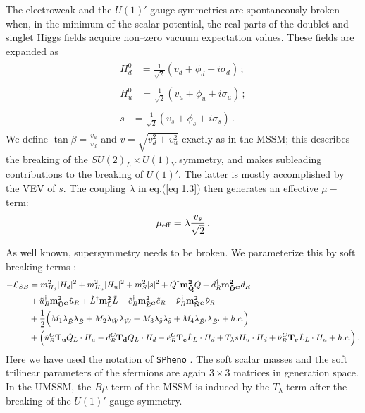 \documentclass[a4paper,11pt]{article}
\begin{document}
The electroweak and the $U(1)'$ gauge symmetries are spontaneously
broken when, in the minimum of the scalar potential, the real parts of
the doublet and singlet Higgs fields acquire non--zero vacuum
expectation values. These fields are expanded as
%
\begin{subequations} \label{vevs}
\begin{align}
\begin{split}
  H_d^0 &= \frac{1}{\sqrt{2}} \left( v_d + \phi_d + i\sigma_d \right)\,;
\end{split}\\
\begin{split}  
  H_u^0 &= \frac{1}{\sqrt{2}} \left( v_u + \phi_u + i\sigma_u \right)\,;  
\end{split}\\
\begin{split}  
  s &= \frac{1}{\sqrt{2}} \left( v_s + \phi_s + i\sigma_s \right)\,.            
\end{split}
\end{align}
\end{subequations}
%
We define $\tan{\beta} = \frac{v_u} {v_d}$ and
$v = \sqrt{v_d^2 + v_u^2}$ exactly as in the MSSM; this describes the
breaking of the $SU(2)_L \times U(1)_Y$ symmetry, and makes subleading
contributions to the breaking of $U(1)'$. The latter is mostly accomplished
by the VEV of $s$. The coupling $\lambda$ in
eq.(\ref{eq 1.3}) then generates an effective $\mu-$term:
%
\begin{equation} \label{eq 1.4}
\mu_{\rm eff} = \lambda \frac{v_{s}}{\sqrt{2}}\,. 
\end{equation}

As well known, supersymmetry needs to be broken. We parameterize this by
soft breaking terms \cite{book}:
%
\begin{align} \label{eq 1.66}
-\mathcal{L}_{SB} &= m^2_{H_d} |H_d|^2 + m^2_{H_u} |H_{u}|^2 + m_S^2 |s|^2
+ \tilde{Q}^\dagger {\bf m^2_{\tilde Q}} \tilde{Q} + 
\tilde{d}_R^{\dagger} {\bf m^2_{\tilde D^C}} \tilde{d}_R \nonumber \\
&+\tilde{u}_{R}^\dagger {\bf m^2_{\tilde U^C}} \tilde{u}_R
+\tilde{L}^\dagger {\bf m^2_{\tilde L}} \tilde{L} 
+\tilde{e}_R^\dagger {\bf m^2_{\tilde{E}^{C}}} \tilde{e}_R
+\tilde{\nu}_{R}^\dagger {\bf m^2_{\tilde N^C}} \tilde{\nu}_{R} \nonumber \\
&+\frac{1}{2}\Big( M_1 \lambda_{\tilde B} \lambda_{\tilde B} + 
M_2 \lambda_{\tilde W} \lambda_{\tilde W} + M_3 \lambda_{\tilde g} \lambda_{\tilde g}
+ M_4\lambda_{\tilde B'} \lambda_{\tilde B'} + h.c.\Big) \\
&+ \Big( \tilde{u}_R^C {\bf T_u} \tilde{Q}_L \cdot H_u 
- \tilde{d}_R^C {\bf T_d} \tilde{Q}_L \cdot H_d
- \tilde{e}_R^C{\bf T_e} \tilde{L}_L \cdot H_d + T_\lambda s H_u \cdot H_d
+ \tilde{\nu}_R^C {\bf T_\nu} \tilde{L}_L \cdot H_u + h.c. \Big)\,. \nonumber
\end{align}
%
Here we have used the notation of {\tt SPheno} \cite{Porod:2003um,
  Porod:2011nf}. The soft scalar masses and the soft trilinear
parameters of the sfermions are again  $3 \times 3$ matrices in generation
space. In the UMSSM, the $B\mu$ term of the MSSM is induced by the
$T_\lambda$ term after the breaking of the $U(1)'$ gauge symmetry.
\end{document}
